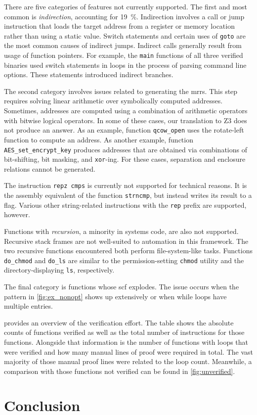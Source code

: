 There are five categories of features not currently supported.
The first and most common is \emph{indirection}, accounting for \SI{19}{\percent}.
Indirection involves a call or jump instruction
that loads the target address from a register or memory location
rather than using a static value.
Switch statements and certain uses of \texttt{goto}
are the most common causes of indirect jumps.
Indirect calls generally result from usage of function pointers.
For example, the \lstinline|main| functions of all three verified binaries
used switch statements in loops in the process of parsing command line options.
These statements introduced indirect branches.

The second category involves issues related to generating the \acp{mrr}.
This step requires solving linear arithmetic over symbolically computed addresses.
Sometimes, addresses are computed using a combination of arithmetic operators
with bitwise logical operators.
In some of these cases, our translation to Z3 does not produce an answer.
As an example, function \texttt{qcow\_open}
uses the rotate-left function to compute an address.
As another example, function \texttt{AES\_set\_encrypt\_key}
produces addresses that are obtained via combinations of bit-shifting,
bit masking, and \texttt{xor}-ing.
For these cases, separation and enclosure relations cannot be generated.

The instruction \texttt{repz cmps} is currently not supported for technical reasons.
It is the assembly equivalent of the function \texttt{strncmp},
but instead writes its result to a flag.
Various other string-related instructions with the \texttt{rep} prefix are supported,
however.

Functions with \emph{recursion}, a minority in systems code, are also not supported.
Recursive stack frames are not well-suited to automation in this framework.
The two recursive functions encountered both perform file-system-like tasks.
Functions \lstinline|do_chmod| and \lstinline|do_ls| are similar to the permission-setting \lstinline|chmod| utility
and the directory-displaying \lstinline|ls|, respectively.

The final category is functions whose \ac{scf} explodes.
The issue occurs when the pattern in \cref{fig:ex_nonopt} shows up extensively
or when while loops have multiple entries.

 provides an overview of the verification effort.
The table shows the absolute counts of functions verified
as well as the total number of instructions for those functions.
Alongside that information is the number of functions with loops
that were verified and how many manual lines of proof were required in total.
The vast majority of those manual proof lines were related to the loop count.
Meanwhile, a comparison with those functions not verified
can be found in \cref{fig:unverified}.

\section{Conclusion}
